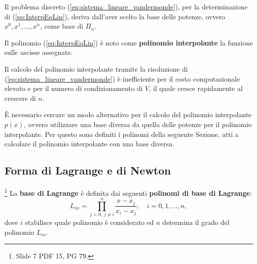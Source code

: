 Il problema discreto (\ref{eq:sistema_lineare_vandermonde}), per la determinazione di (\ref{eq:InterpEqLin}), deriva dall'aver scelto la base delle potenze, ovvero ${x^0,x^1,\hdots, x^n}$, come base di $\Pi_n$.

\begin{definition}
    Il polinomio (\ref{eq:InterpEqLin}) è noto come \textbf{polinomio interpolante} la funzione sulle ascisse assegnate.
\end{definition}

Il calcolo del polinomio interpolante tramite la risoluzione di (\ref{eq:sistema_lineare_vandermonde}) è inefficiente per il costo computazionale elevato e per il numero di condizionamento di $V$, il quale cresce rapidamente al crescere di $n$.

È necessario cercare un modo alternativo per il calcolo del polinomio interpolante $p(x)$, ovvero utilizzare una base diversa da quella delle potenze per il polinomio interpolante. Per questo sono definiti i polinomi della seguente Sezione, atti a calcolare il polinomio interpolante con una base diversa.

\subsection{Forma di Lagrange e di Newton}
\begin{definition}\footnote{Slide 7 PDF 15, PG 79.}
    La \textbf{base di Lagrange} è definita dai seguenti \textbf{polinomi di base di Lagrange}:
    \begin{equation}\label{eq:polLagrange}
        L_{in}=\prod_{j=0,\,j\neq i}^{n} \frac{x-x_j}{x_i-x_j},\quad i=0,1,\hdots,n, 
    \end{equation}
    dove $i$ stabilisce quale polinomio è considerato ed $n$ determina il grado del polinomio $L_{in}$.
\end{definition}

